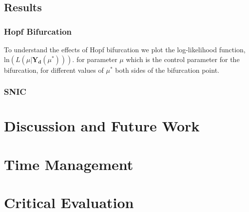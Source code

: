 \documentclass[12pt,a4paper,titlepage]{article}
\begin{document}
\subsection{Results}
\subsubsection{Hopf Bifurcation}
To understand the effects of Hopf bifurcation we plot the log-likelihood function, $\text{ln}(L(\mu | \mathbf{Y_{d}}(\mu^*)))$.  for parameter $\mu$ which is the control parameter for the bifurcation, for different values of $\mu^*$ both sides of the bifurcation point.  

\subsubsection{SNIC}


%







\section{Discussion and Future Work}

\newpage

\appendix
\section{Time Management}
\section{Critical Evaluation}
\end{document}
